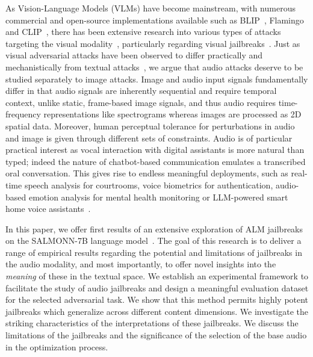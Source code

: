 As Vision-Language Models (VLMs) have become mainstream, with numerous commercial and open-source implementations available such as BLIP~\citep{li2022blip}, Flamingo~\citep{alayrac2022flamingovisuallanguagemodel} and CLIP~\citep{radford2021clip}, there has been extensive research into various types of attacks targeting the visual modality~\citep{goodfellow2014explaining, eykholt2018robustphysical, shafahi2018poisonfrog, hosseini2017semanticattack}, particularly regarding visual jailbreaks~\citep{carlini2024alignedneuralnetworksadversarially, qi2023visualadversarialexamplesjailbreak, li2024imagesachillesheelalignment, feng2024jailbreaklensvisualanalysisjailbreak}. Just as visual adversarial attacks have been observed to differ practically and mechanistically from textual attacks~\citep{schaeffer2024transferability, wallace2021nlpattacks}, we argue that audio attacks deserve to be studied separately to image attacks.  Image and audio input signals fundamentally differ in that audio signals are inherently sequential and require temporal context, unlike static, frame-based image signals, and thus audio requires time-frequency representations like spectrograms whereas images are processed as 2D spatial data. Moreover, human perceptual tolerance for perturbations in audio and image is given through different sets of constraints. Audio is of particular practical interest as vocal interaction with digital assistants is more natural than typed; indeed the nature of chatbot-based communication emulates a transcribed oral conversation. This gives rise to endless meaningful deployments, such as real-time speech analysis for courtrooms, voice biometrics for authentication, audio-based emotion analysis for mental health monitoring or LLM-powered smart home voice assistants~\cite{Mahmood_2025, koffi2023voice}. 

In this paper, we offer first results of an extensive exploration of ALM jailbreaks on the SALMONN-7B language model~\citep{tang2024salmonn}. The goal of this research is to deliver a range of empirical results regarding the potential and limitations of jailbreaks in the audio modality, and most importantly, to offer novel insights into the \textit{meaning} of these in the textual space. We establish an experimental framework to facilitate the study of audio jailbreaks and design a meaningful evaluation dataset for the selected adversarial task. We show that this method permits highly potent jailbreaks which generalize across different content dimensions. We investigate the striking characteristics of the interpretations of these jailbreaks. We discuss the limitations of the jailbreaks and the significance of the selection of the base audio in the optimization process.

